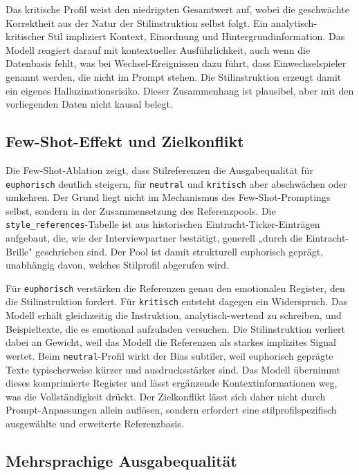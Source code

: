 Das kritische Profil weist den niedrigsten Gesamtwert auf, wobei die geschwächte Korrektheit aus der Natur der Stilinstruktion selbst folgt. Ein analytisch-kritischer Stil impliziert Kontext, Einordnung und Hintergrundinformation. Das Modell reagiert darauf mit kontextueller Ausführlichkeit, auch wenn die Datenbasis fehlt, was bei Wechsel-Ereignissen dazu führt, dass Einwechselspieler genannt werden, die nicht im Prompt stehen. Die Stilinstruktion erzeugt damit ein eigenes Halluzinationsrisiko. Dieser Zusammenhang ist plausibel, aber mit den vorliegenden Daten nicht kausal belegt.

\subsection{Few-Shot-Effekt und Zielkonflikt}\label{diskussion-fewshot}

Die Few-Shot-Ablation zeigt, dass Stilreferenzen die Ausgabequalität für \texttt{euphorisch} deutlich steigern, für \texttt{neutral} und \texttt{kritisch} aber abschwächen oder umkehren. Der Grund liegt nicht im Mechanismus des Few-Shot-Promptings selbst, sondern in der Zusammensetzung des Referenzpools. Die \texttt{style\_references}-Tabelle ist aus historischen Eintracht-Ticker-Einträgen aufgebaut, die, wie der Interviewpartner bestätigt, generell „durch die Eintracht-Brille" geschrieben sind. Der Pool ist damit strukturell euphorisch geprägt, unabhängig davon, welches Stilprofil abgerufen wird.

Für \texttt{euphorisch} verstärken die Referenzen genau den emotionalen Register, den die Stilinstruktion fordert. Für \texttt{kritisch} entsteht dagegen ein Widerspruch. Das Modell erhält gleichzeitig die Instruktion, analytisch-wertend zu schreiben, und Beispieltexte, die es emotional aufzuladen versuchen. Die Stilinstruktion verliert dabei an Gewicht, weil das Modell die Referenzen als starkes implizites Signal wertet. Beim \texttt{neutral}-Profil wirkt der Bias subtiler, weil euphorisch geprägte Texte typischerweise kürzer und ausdrucksstärker sind. Das Modell übernimmt dieses komprimierte Register und lässt ergänzende Kontextinformationen weg, was die Vollständigkeit drückt. Der Zielkonflikt lässt sich daher nicht durch Prompt-Anpassungen allein auflösen, sondern erfordert eine stilprofilspezifisch ausgewählte und erweiterte Referenzbasis.

\subsection{Mehrsprachige Ausgabequalität}\label{diskussion-mehrsprachigkeit}

